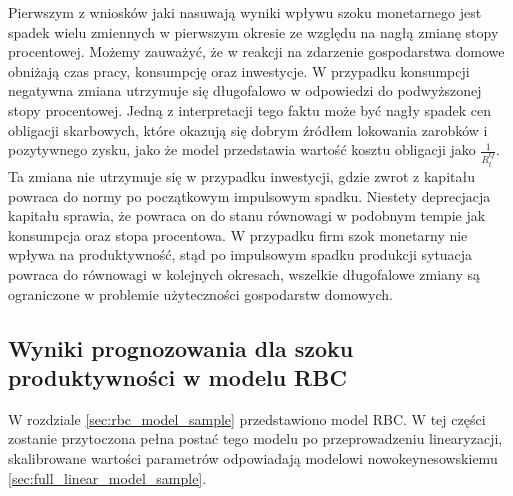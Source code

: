 Pierwszym z wniosków jaki nasuwają wyniki wpływu szoku monetarnego jest spadek wielu zmiennych w pierwszym okresie ze względu na nagłą zmianę stopy procentowej. Możemy zauważyć, że w reakcji na zdarzenie gospodarstwa domowe obniżają czas pracy, konsumpcję oraz inwestycje. W przypadku konsumpcji negatywna zmiana utrzymuje się długofalowo w odpowiedzi do podwyższonej stopy procentowej. Jedną z interpretacji tego faktu może być nagły spadek cen obligacji skarbowych, które okazują się dobrym źródłem lokowania zarobków i pozytywnego zysku, jako że model przedstawia wartość kosztu obligacji jako $\frac{1}{R_t^Q}$. Ta zmiana nie utrzymuje się w przypadku inwestycji, gdzie zwrot z kapitału powraca do normy po początkowym impulsowym spadku. Niestety deprecjacja kapitału sprawia, że powraca on do stanu równowagi w podobnym tempie jak konsumpcja oraz stopa procentowa. W przypadku firm szok monetarny nie wpływa na produktywność, stąd po impulsowym spadku produkcji sytuacja powraca do równowagi w kolejnych okresach, wszelkie długofalowe zmiany są ograniczone w problemie użyteczności gospodarstw domowych.

\subsection{Wyniki prognozowania dla szoku produktywności w modelu RBC}
\label{sec:results_rbc_prod}

W rozdziale \ref{sec:rbc_model_sample} przedstawiono model RBC. W tej części zostanie przytoczona pełna postać tego modelu po przeprowadzeniu linearyzacji, skalibrowane wartości parametrów odpowiadają modelowi nowokeynesowskiemu \ref{sec:full_linear_model_sample}.

